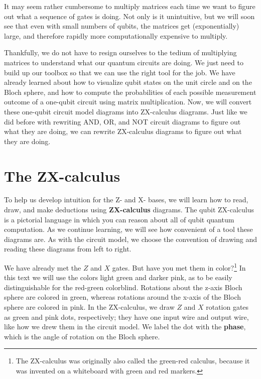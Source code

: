 \documentclass{article}
\theoremstyle{definition}
\begin{document}
It may seem rather cumbersome to multiply matrices each time we want to figure out what a sequence of gates is doing.  Not only is it unintuitive, but we will soon see that even with small numbers of qubits, the matrices get (exponentially) large, and therefore rapidly more computationally expensive to multiply.

Thankfully, we do not have to resign ourselves to the tedium of multiplying matrices to understand what our quantum circuits are doing.  We just need to build up our toolbox so that we can use the right tool for the job.  We have already learned about how to visualize qubit states on the unit circle and on the Bloch sphere, and how to compute the probabilities of each possible measurement outcome of a one-qubit circuit using matrix multiplication.  Now, we will convert these one-qubit circuit model diagrams into ZX-calculus diagrams.  Just like we did before with rewriting AND, OR, and NOT circuit diagrams to figure out what they are doing, we can rewrite ZX-calculus diagrams to figure out what they are doing.

\newpage

\section{The ZX-calculus}
To help us develop intuition for the Z- and X- bases, we will learn how to read, draw, and make deductions using \textbf{ZX-calculus} diagrams.  The qubit ZX-calculus is a pictorial language in which you can reason about all of qubit quantum computation.  As we continue learning, we will see how convenient of a tool these diagrams are.  As with the circuit model, we choose the convention of drawing and reading these diagrams from left to right.

We have already met the $Z$ and $X$ gates.  But have you met them in color?\footnote{The ZX-calculus was originally also called the green-red calculus, because it was invented on a whiteboard with green and red markers.}  In this text we will use the colors light green and darker pink, as to be easily distinguishable for the red-green colorblind.  Rotations about the z-axis Bloch sphere are colored in green, whereas rotations around the x-axis of the Bloch sphere are colored in pink.  In the ZX-calculus, we draw $Z$ and $X$ rotation gates as green and pink dots, respectively; they have one input wire and output wire, like how we drew them in the circuit model.  We label the dot with the \textbf{phase}, which is the angle of rotation on the Bloch sphere.
\end{document}
